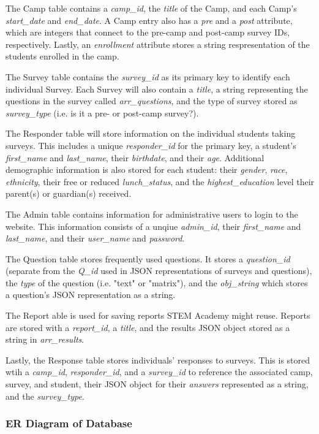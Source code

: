 \documentclass[letterpaper,10pt,serif,draftclsnofoot,onecolumn,compsoc,titlepage]{IEEEtran}
\begin{document}
The Camp table contains a \emph{camp\_id}, the \emph{title} of the Camp, and each Camp's \emph{start\_date} and \emph{end\_date}.
A Camp entry also has a \emph{pre} and a \emph{post} attribute, which are integers that connect to the pre-camp and post-camp survey IDs, respectively.
Lastly, an \emph{enrollment} attribute stores a string respresentation of the students enrolled in the camp.

The Survey table contains the \emph{survey\_id} as its primary key to identify each individual Survey.
Each Survey will also contain a \emph{title}, a string representing the questions in the survey called \emph{arr\_questions}, and the type of survey stored as \emph{survey\_type} (i.e. is it a pre- or post-camp survey?).

The Responder table will store information on the individual students taking surveys.
This includes a unique \emph{responder\_id} for the primary key, a student's \emph{first\_name} and \emph{last\_name}, their \emph{birthdate}, and their \emph{age}.
Additional demographic information is also stored for each student: their \emph{gender}, \emph{race}, \emph{ethnicity}, their free or reduced \emph{lunch\_status}, and the \emph{highest\_education} level their parent(s) or guardian(s) received.

The Admin table contains information for administrative users to login to the website.
This information consists of a unqiue \emph{admin\_id}, their \emph{first\_name} and \emph{last\_name}, and their \emph{user\_name} and \emph{password}.

The Question table stores frequently used questions.
It stores a \emph{question\_id} (separate from the \emph{Q\_id} used in JSON representations of surveys and questions), the \emph{type} of the question (i.e. "text" or "matrix"), and the \emph{obj\_string} which stores a question's JSON representation as a string.

The Report able is used for saving reports STEM Academy might reuse.
Reports are stored with a \emph{report\_id}, a \emph{title}, and the results JSON object stored as a string in \emph{arr\_results}.

Lastly, the Response table stores individuals' responses to surveys.
This is stored wtih a \emph{camp\_id}, \emph{responder\_id}, and a \emph{survey\_id} to reference the associated camp, survey, and student, their JSON object for their \emph{answers} represented as a string, and the \emph{survey\_type}.
\subsubsection{ER Diagram of Database}
\end{document}
